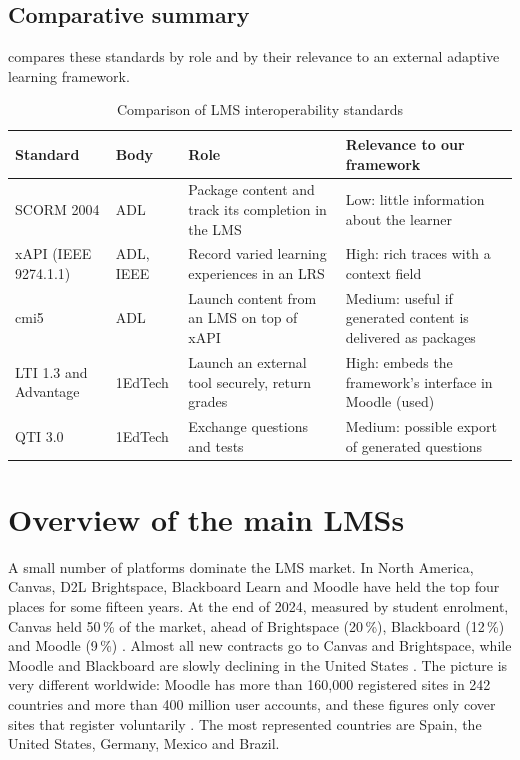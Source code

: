 \subsection{Comparative summary}

 compares these standards by role and by their
relevance to an external adaptive learning framework.

\begin{table}[htbp]
\centering
\caption{Comparison of LMS interoperability standards}
\label{tab-standards}
\small
\begin{tabularx}{\textwidth}{@{}L{1.9cm}L{2cm}YY@{}}
\toprule
\textbf{Standard} & \textbf{Body} & \textbf{Role} & \textbf{Relevance to our framework} \\
\midrule
SCORM 2004 & ADL & Package content and track its completion in the LMS &
  Low: little information about the learner \\
xAPI (IEEE 9274.1.1) & ADL, IEEE & Record varied learning experiences in
  an LRS & High: rich traces with a context field \\
cmi5 & ADL & Launch content from an LMS on top of xAPI &
  Medium: useful if generated content is delivered as packages \\
LTI 1.3 and Advantage & 1EdTech & Launch an external tool securely, return
  grades & High: embeds the framework's interface in Moodle (used) \\
QTI 3.0 & 1EdTech & Exchange questions and tests &
  Medium: possible export of generated questions \\
\bottomrule
\end{tabularx}
\end{table}

\section{Overview of the main LMSs}
\label{sec-overview}

A small number of platforms dominate the LMS market. In North America,
Canvas, D2L Brightspace, Blackboard Learn and Moodle have held the top four
places for some fifteen years. At the end of 2024, measured by student
enrolment, Canvas held 50\,\% of the market, ahead of Brightspace
(20\,\%), Blackboard (12\,\%) and Moodle (9\,\%) \cite{onedtech2024}.
Almost all new contracts go to Canvas and Brightspace, while Moodle and
Blackboard are slowly declining in the United States
\cite{edutechnica2025}. The picture is very different worldwide: Moodle
has more than 160,000 registered sites in 242 countries and more than 400
million user accounts, and these figures only cover sites that register
voluntarily \cite{moodle_stats}. The most represented countries are Spain,
the United States, Germany, Mexico and Brazil.

